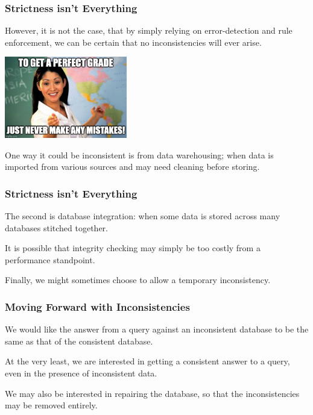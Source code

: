 \begin{frame}
\frametitle{Strictness isn't Everything}

However, it is not the case, that by simply relying on error-detection and rule enforcement, we can be certain that no inconsistencies will ever arise. 

\begin{center}
	\includegraphics[width=0.4\textwidth]{images/mistakes.jpg}
\end{center}

One way it could be inconsistent is from data warehousing; when data is imported from various sources and may need cleaning before storing. 


\end{frame}


\begin{frame}
\frametitle{Strictness isn't Everything}


The second is database integration: when some data is stored across many databases stitched together.

It is possible that integrity checking may simply be too costly from a performance standpoint.

Finally, we might sometimes choose to allow a temporary inconsistency.

\end{frame}


\begin{frame}
\frametitle{Moving Forward with Inconsistencies}

We would like the answer from a query against an inconsistent database to be the same as that of the consistent database. 

At the very least, we are interested in getting a consistent answer to a query, even in the presence of inconsistent data. 

We may also be interested in repairing the database, so that the inconsistencies may be removed entirely.

\end{frame}


